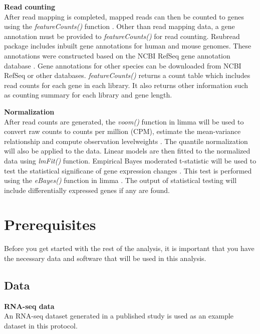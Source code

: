 \documentclass[]{book}
\begin{document}
\textbf{Read counting}\\
After read mapping is completed, mapped reads can then be counted to genes using the \emph{featureCounts()} function \citep{liao2013featurecounts}. Other than read mapping data, a gene annotation must be provided to \emph{featureCounts()} for read counting. Rsubread package includes inbuilt gene annotations for human and mouse genomes. These annotations were constructed based on the NCBI RefSeq gene annotation database \citep{o2015reference}. Gene annotations for other species can be downloaded from NCBI RefSeq or other databases. \emph{featureCounts()} \citep{R-Rsubread} returns a count table which includes read counts for each gene in each library. It also returns other information such as counting summary for each library and gene length.

\textbf{Normalization}\\
After read counts are generated, the \emph{voom()} function in limma will be used to convert raw counts to counts per million (CPM), estimate the mean-variance relationship and compute observation levelweights \citep{law2014voom}. The quantile normalization will also be applied to the data. Linear models are then fitted to the normalized data using \emph{lmFit()} function. Empirical Bayes moderated t-statistic will be used to test the statistical significane of gene expression changes \citep{smyth2004linear}. This test is performed using the \emph{eBayes()} function in limma \citep{R-limma}. The output of statistical testing will include differentially expressed genes if any are found.

\hypertarget{prerequisites}{%
\chapter{Prerequisites}\label{prerequisites}}

Before you get started with the rest of the analysis, it is important that you have the necessary data and software that will be used in this analysis.

\hypertarget{data}{%
\section{Data}\label{data}}

\textbf{RNA-seq data}\\
An RNA-seq dataset generated in a published study \citep{delconte2016cis} is used as an example dataset in this protocol.\\
\end{document}
